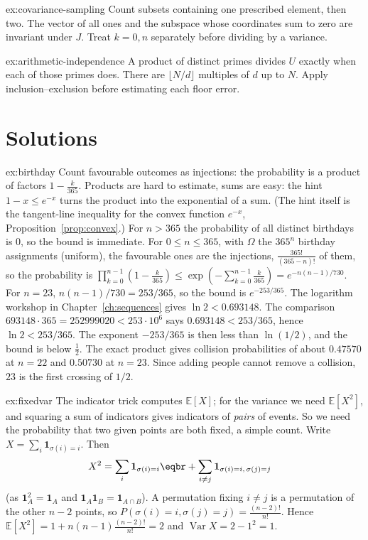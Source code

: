 \begin{hint}{ex:covariance-sampling}
Count subsets containing one prescribed element, then two. The vector of all
ones and the subspace whose coordinates sum to zero are invariant under $J$.
Treat $k=0,n$ separately before dividing by a variance.
\end{hint}

\begin{hint}{ex:arithmetic-independence}
A product of distinct primes divides $U$ exactly when each of those primes does.
There are $\lfloor N/d\rfloor$ multiples of $d$ up to $N$. Apply
inclusion--exclusion before estimating each floor error.
\end{hint}

\section{Solutions}

\begin{solution}{ex:birthday}
\idea Count favourable outcomes as injections: the probability is a product of factors $1-\frac k{365}$. Products are hard to estimate, sums are easy: the hint $1-x\le e^{-x}$ turns the product into the exponential of a sum. (The hint itself is the tangent-line inequality for the convex function $e^{-x}$, Proposition~\ref{prop:convex}.)
\writeup For $n>365$ the probability of all distinct birthdays is $0$, so the bound is immediate. For $0\le n\le365$, with $\Omega$ the $365^n$ birthday assignments (uniform), the favourable ones are the injections, $\frac{365!}{(365-n)!}$ of them, so the probability is $\prod_{k=0}^{n-1}\left(1-\frac k{365}\right)\le\exp\left(-\sum_{k=0}^{n-1}\frac k{365}\right)=e^{-n(n-1)/730}$.
For $n=23$, $n(n-1)/730=253/365$, so the bound is $e^{-253/365}$. The logarithm workshop in Chapter~\ref{ch:sequences} gives $\ln2<0.693148$. The comparison $693148\cdot365=252999020<253\cdot10^6$ says $0.693148<253/365$, hence $\ln2<253/365$. The exponent $-253/365$ is then less than $\ln(1/2)$, and the bound is below $\frac12$.
The exact product gives collision probabilities of about $0.47570$ at $n=22$ and $0.50730$ at $n=23$. Since adding people cannot remove a collision, $23$ is the first crossing of $1/2$.
\end{solution}

\begin{solution}{ex:fixedvar}
\idea The indicator trick computes $\mathbb E[X]$; for the variance we need $\mathbb E[X^2]$, and squaring a sum of indicators gives indicators of \emph{pairs} of events. So we need the probability that two given points are both fixed, a simple count.
\writeup Write $X=\sum_i\mathbf 1_{\sigma(i)=i}$. Then
\[
\begin{aligned}X^2&=\sum_i\mathbf 1_{\sigma(i)=i}\eqbr+\sum_{i\ne j}\mathbf 1_{\sigma(i)=i,\,\sigma(j)=j}\end{aligned}
\]
(as $\mathbf 1_A^2=\mathbf 1_A$ and $\mathbf 1_A\mathbf 1_B=\mathbf 1_{A\cap B}$). A permutation fixing $i\ne j$ is a permutation of the other $n-2$ points,
so $P(\sigma(i)=i,\sigma(j)=j)=\frac{(n-2)!}{n!}$. Hence $\mathbb E[X^2]=1+n(n-1)\frac{(n-2)!}{n!}=2$ and $\operatorname{Var}X=2-1^2=1$.
\end{solution}


